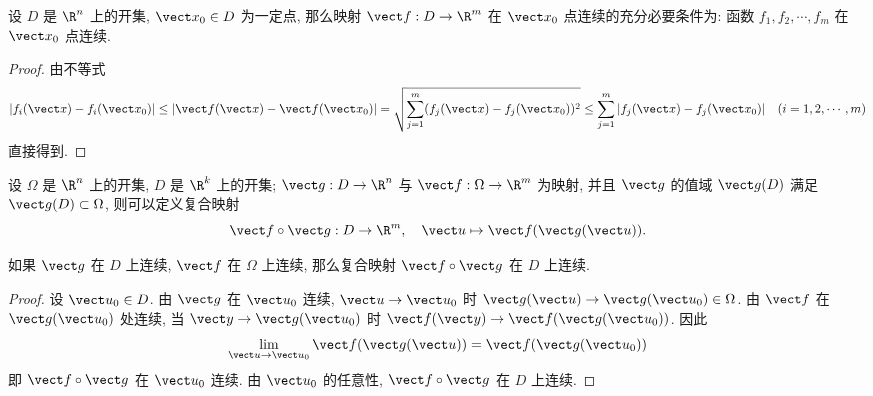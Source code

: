 \begin{proposition}
	设 $D$ 是 $\R^n$ 上的开集, $\vect x_0 \in D$ 为一定点, 那么映射 $\vect f: D \to \R^m$ 在 $\vect x_0$ 点连续的充分必要条件为: 函数 $f_1, f_2, \cdots, f_m$ 在 $\vect x_0$ 点连续.


\end{proposition}
\begin{proof}
	由不等式
\[
|f_i(\vect x) - f_i(\vect x_0)| \le |\vect f(\vect x) - \vect f(\vect x_0)| = \sqrt{\sum_{j=1}^m (f_j(\vect x) - f_j(\vect x_0))^2} \le \sum_{j=1}^m |f_j(\vect x) - f_j(\vect x_0)| \quad (i = 1, 2, \cdots, m)
\]
直接得到.
\end{proof}
\begin{definition}
	设 $\Omega$ 是 $\R^n$ 上的开集, $D$ 是 $\R^k$ 上的开集; $\vect g: D \to \R^n$ 与 $\vect f: \Omega \to \R^m$ 为映射, 并且 $\vect g$ 的值域 $\vect g(D)$ 满足 $\vect g(D) \subset \Omega$, 则可以定义复合映射
\[
\vect f \circ \vect g: D \to \R^m, \quad \vect u \mapsto \vect f(\vect g(\vect u)).
\]

\end{definition}
\begin{proposition}
	如果 $\vect g$ 在 $D$ 上连续, $\vect f$ 在 $\Omega$ 上连续, 那么复合映射 $\vect f \circ \vect g$ 在 $D$ 上连续.
\end{proposition}

\begin{proof}
	设 $\vect u_0 \in D$. 由 $\vect g$ 在 $\vect u_0$ 连续, $\vect u \to \vect u_0$ 时 $\vect g(\vect u) \to \vect g(\vect u_0) \in \Omega$. 由 $\vect f$ 在 $\vect g(\vect u_0)$ 处连续, 当 $\vect y \to \vect g(\vect u_0)$ 时 $\vect f(\vect y) \to \vect f(\vect g(\vect u_0))$. 因此 $$\lim\limits_{\vect u \to \vect u_0} \vect f(\vect g(\vect u)) = \vect f(\vect g(\vect u_0))$$ 即 $\vect f \circ \vect g$ 在 $\vect u_0$ 连续. 由 $\vect u_0$ 的任意性, $\vect f \circ \vect g$ 在 $D$ 上连续.
\end{proof}


